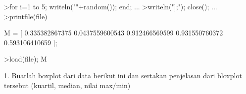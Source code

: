 \documentclass[a4paper,10pt]{article}
\begin{document}
\begin{eulernotebook}
\begin{eulercomment}
\begin{eulercomment}
\begin{eulercomment}
\begin{eulercomment}
\begin{eulercomment}
\begin{eulercomment}
\begin{eulercomment}
\begin{eulercomment}
\begin{eulercomment}
\begin{eulercomment}
\begin{eulercomment}
\begin{eulercomment}
\begin{eulercomment}
\begin{eulercomment}
\begin{eulercomment}
\begin{eulercomment}
\begin{eulercomment}
\begin{eulercomment}
\begin{eulercomment}
\begin{eulercomment}
\begin{eulercomment}
\begin{eulercomment}
\begin{eulercomment}
\begin{eulercomment}
\begin{eulerprompt}
>for i=1 to 5; writeln(""+random()); end; ...
>writeln("];"); close(); ...
>printfile(file)
\end{eulerprompt}
\begin{euleroutput}
  M = [
  0.335382867375
  0.0437559600543
  0.912466569599
  0.931550760372
  0.593106410659
  ];
\end{euleroutput}
\begin{eulerprompt}
>load(file); M
\end{eulerprompt}
\begin{euleroutput}
  [0.33538,  0.043756,  0.91247,  0.93155,  0.59311]
\end{euleroutput}
\begin{eulercomment}
1. Buatlah boxplot dari data berikut ini dan sertakan penjelasan dari
bloxplot tersebut (kuartil, median, nilai max/min)


\end{eulercomment}
\end{eulercomment}
\end{eulercomment}
\end{eulercomment}
\end{eulercomment}
\end{eulercomment}
\end{eulercomment}
\end{eulercomment}
\end{eulercomment}
\end{eulercomment}
\end{eulercomment}
\end{eulercomment}
\end{eulercomment}
\end{eulercomment}
\end{eulercomment}
\end{eulercomment}
\end{eulercomment}
\end{eulercomment}
\end{eulercomment}
\end{eulercomment}
\end{eulercomment}
\end{eulercomment}
\end{eulercomment}
\end{eulercomment}
\end{eulercomment}
\end{eulernotebook}
\end{document}
